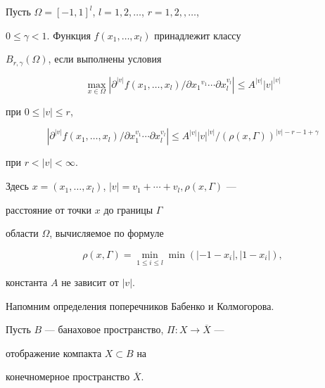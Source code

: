 \begin{defns} Пусть $\Omega=[-1,1]^l$, $l=1,2,\dotsc$, $r=1,2,,\dotsc$,


$0\le\gamma<1$. Функция $f(x_1,\dotsc,x_l)$ принадлежит классу


$B_{r,\gamma}(\Omega)$, если выполнены условия


$$


\max_{x\in\Omega}|\partial^{|v|}


f(x_1,\dotsc,x_l)/\partial{x_1}^{v_1}\dotsb


\partial x_l^{v_l}|\le A^{|v|}


|v|^{|v|}


$$


при $0\le|v|\le r$,


$$


|\partial^{|v|} f(x_1,\dotsc, x_l)/


\partial x_1^{v_1}\dotsb\partial x_l^{v_l}


|\le A^{| v|}| v|^{| v|}/(\rho(x,\Gamma))^{| v|-r-1+\gamma}


$$


при $r<| v| <\infty$.





Здесь $x=(x_1,\dotsc,x_l)$, $|v|=v_1+\dotsb+v_l,\rho(x,\Gamma)$ ---


расстояние от точки $x$ до границы $\Gamma$


области $\Omega$, вычисляемое по формуле


$$


\rho(x,\Gamma)=\min_{1\le i \le l}\min(|-1-x_i|,| 1-x_i|),


$$


константа $A$ не зависит от $|v|$.


\end{defns}





Напомним определения поперечников Бабенко и Колмогорова.





Пусть $B$ --- банаховое пространство, $\Pi:X\to \overline{X}$ ---


отображение компакта $X \subset B$ на


конечномерное пространство $\overline {X}$.





